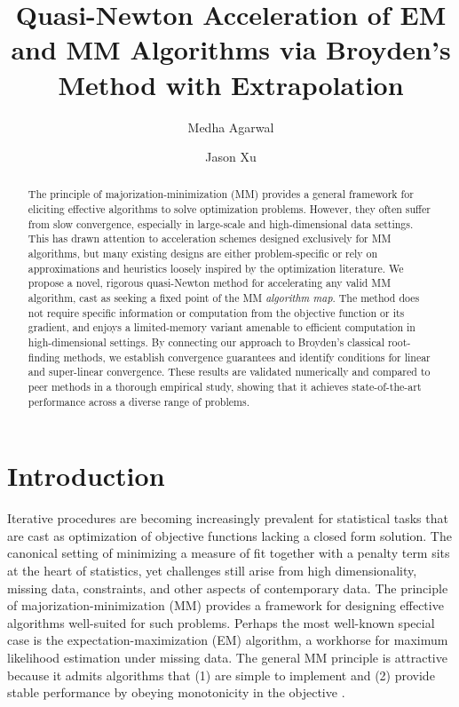 \documentclass{statsoc}
\title[Broyden Quasi-Newton Acceleration for MM]{Quasi-Newton Acceleration of EM and MM Algorithms via Broyden's Method with Extrapolation}
\author[Medha Agarwal {\it et al.}]{Medha Agarwal}
\author[Agarwal and Xu]{Jason Xu}
\begin{document}
\begin{abstract}

The principle of majorization-minimization (MM) provides a general framework for eliciting effective algorithms to solve optimization problems. However, they often suffer from slow convergence, especially in large-scale and  high-dimensional data settings. This has drawn attention to  acceleration schemes designed exclusively for MM algorithms, but  many existing designs are either  problem-specific or rely on approximations and heuristics loosely inspired by the optimization literature. We propose a novel, rigorous  quasi-Newton method for accelerating any valid MM algorithm, cast as seeking a fixed point of the MM \textit{algorithm map}. The method does not require specific information or computation from the objective function or its gradient, and enjoys a limited-memory variant amenable to efficient computation in high-dimensional settings. By connecting our approach to Broyden's classical root-finding methods, we establish convergence guarantees and identify conditions for linear and super-linear convergence. These results are validated numerically and compared to peer methods in a thorough empirical study, showing that it achieves state-of-the-art performance across a diverse range of problems.



\end{abstract}

\section{Introduction}
 Iterative procedures are becoming increasingly prevalent for statistical tasks that are cast as optimization of  objective functions lacking a closed form solution. The canonical setting of minimizing a measure of fit together with a penalty term sits at the heart of statistics, yet challenges still arise from high dimensionality, missing data, constraints, and other aspects of contemporary data. 
The principle of majorization-minimization (MM) provides a framework for designing effective algorithms well-suited for such problems. Perhaps the most well-known special case is the expectation-maximization (EM) algorithm, a workhorse for maximum likelihood estimation under missing data. The general MM principle is attractive because it admits algorithms that (1) are  simple to implement and (2) provide stable performance by obeying monotonicity in the objective  \citep{dempster1977maximum,laird1978nonparametric}.
\end{document}
